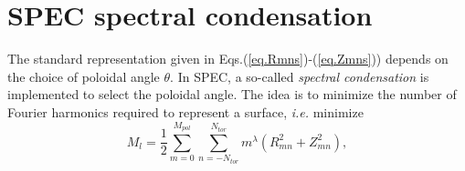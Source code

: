 \chapter{SPEC spectral condensation} \label{spec coord and spectral constraints}
%
%
The standard representation given in Eqs.(\ref{eq.Rmns})-(\ref{eq.Zmns})) depends on the choice of poloidal angle $\theta$. In SPEC, a so-called \emph{spectral condensation} \citep{Hirshman1986} is implemented to select the poloidal angle. The idea is to minimize the number of Fourier harmonics required to represent a surface, \textit{i.e.} minimize
\begin{equation}
	M_l = \frac{1}{2}\sum_{m=0}^{M_{pol}}\sum_{n=-N_{tor}}^{N_{tor}} m^\lambda (R_{mn}^2 + Z_{mn}^2), \label{eq.spectral width}
\end{equation}

